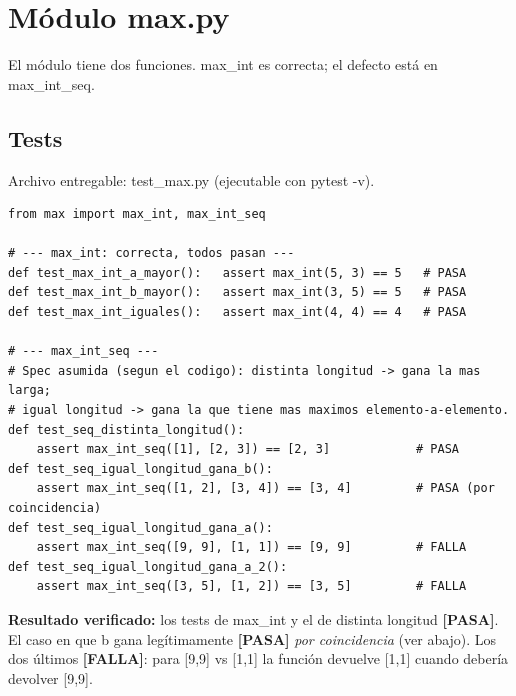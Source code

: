 \documentclass[11pt,a4paper]{article}
\newcommand{\lblP}{\textcolor{ok}{\textbf{[PASA]}}}
\newcommand{\lblF}{\textcolor{bad}{\textbf{[FALLA]}}}
\newcommand{\code}[1]{\colorbox{codebg}{\ttfamily\small #1}}
\begin{document}
\section{Módulo \code{max.py}}

El módulo tiene dos funciones. \code{max\_int} es correcta; el defecto está en \code{max\_int\_seq}.

\subsection{Tests}
Archivo entregable: \code{test\_max.py} (ejecutable con \code{pytest -v}).

\begin{lstlisting}[style=py]
from max import max_int, max_int_seq

# --- max_int: correcta, todos pasan ---
def test_max_int_a_mayor():   assert max_int(5, 3) == 5   # PASA
def test_max_int_b_mayor():   assert max_int(3, 5) == 5   # PASA
def test_max_int_iguales():   assert max_int(4, 4) == 4   # PASA

# --- max_int_seq ---
# Spec asumida (segun el codigo): distinta longitud -> gana la mas larga;
# igual longitud -> gana la que tiene mas maximos elemento-a-elemento.
def test_seq_distinta_longitud():
    assert max_int_seq([1], [2, 3]) == [2, 3]            # PASA
def test_seq_igual_longitud_gana_b():
    assert max_int_seq([1, 2], [3, 4]) == [3, 4]         # PASA (por coincidencia)
def test_seq_igual_longitud_gana_a():
    assert max_int_seq([9, 9], [1, 1]) == [9, 9]         # FALLA
def test_seq_igual_longitud_gana_a_2():
    assert max_int_seq([3, 5], [1, 2]) == [3, 5]         # FALLA
\end{lstlisting}

\textbf{Resultado verificado:} los tests de \code{max\_int} y el de distinta longitud \lblP{}.
El caso en que \code{b} gana legítimamente \lblP{} \emph{por coincidencia} (ver abajo).
Los dos últimos \lblF{}: para \code{[9,9]} vs \code{[1,1]} la función devuelve \code{[1,1]} cuando
debería devolver \code{[9,9]}.
\end{document}
